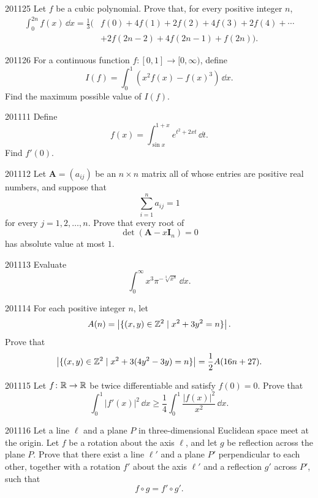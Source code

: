 \begin{problem}{2011}{2}{5}
Let $f$ be a cubic polynomial. Prove that, for every positive integer $n$,
\[
\begin{aligned}
    \int_0^{2n}f(x)\, \dd x
    =\frac13\bigl(&f(0)+4f(1)+2f(2)+4f(3)+2f(4)+\cdots\\
    &+2f(2n-2)+4f(2n-1)+f(2n)\bigr).
\end{aligned}
\]
\end{problem}

\begin{problem}{2011}{2}{6}
For a continuous function $f\colon[0, 1]\to[0, \infty)$, define
\[
    I(f)=\int_0^1\left(x^2f(x)-f(x)^3\right)\, \dd x.
\]
Find the maximum possible value of $I(f)$.
\end{problem}

\begin{problem}{2011}{1}{1}
Define
\[
    f(x)=\int_{\sin x}^{1+x}e^{t^2+2xt}\, \dd t.
\]
Find $f'(0)$.
\end{problem}

\begin{problem}{2011}{1}{2}
Let $\mathbf A=(a_{ij})$ be an $n\times n$ matrix all of whose entries are positive real numbers, and suppose that
\[
    \sum_{i=1}^n a_{ij}=1
\]
for every $j=1, 2, \dots, n$. Prove that every root of
\[
    \det(\mathbf A-x\mathbf I_n)=0
\]
has absolute value at most $1$.
\end{problem}

\begin{problem}{2011}{1}{3}
Evaluate
\[
    \int_0^{\infty}x^3\pi^{-\sqrt[3]{x^8}}\, \dd x.
\]
\end{problem}

\begin{problem}{2011}{1}{4}
For each positive integer $n$, let
\[
    A(n)=\left|\{(x, y)\in\mathbb{Z}^2\mid x^2+3y^2=n\}\right|.
\]
Prove that
\[
    \left|\{(x, y)\in\mathbb{Z}^2\mid x^2+3(4y^2-3y)=n\}\right|
    =\frac12A(16n+27).
\]
\end{problem}

\begin{problem}{2011}{1}{5}
Let $f\colon\mathbb{R}\to\mathbb{R}$ be twice differentiable and satisfy $f(0)=0$. Prove that
\[
    \int_0^1|f'(x)|^2\, \dd x
    \ge
    \frac14\int_0^1\frac{|f(x)|^2}{x^2}\, \dd x.
\]
\end{problem}

\begin{problem}{2011}{1}{6}
Let a line $\ell$ and a plane $P$ in three-dimensional Euclidean space meet at the origin. Let $f$ be a rotation about the axis $\ell$, and let $g$ be reflection across the plane $P$. Prove that there exist a line $\ell'$ and a plane $P'$ perpendicular to each other, together with a rotation $f'$ about the axis $\ell'$ and a reflection $g'$ across $P'$, such that
\[
    f\circ g=f'\circ g'.
\]
\end{problem}
